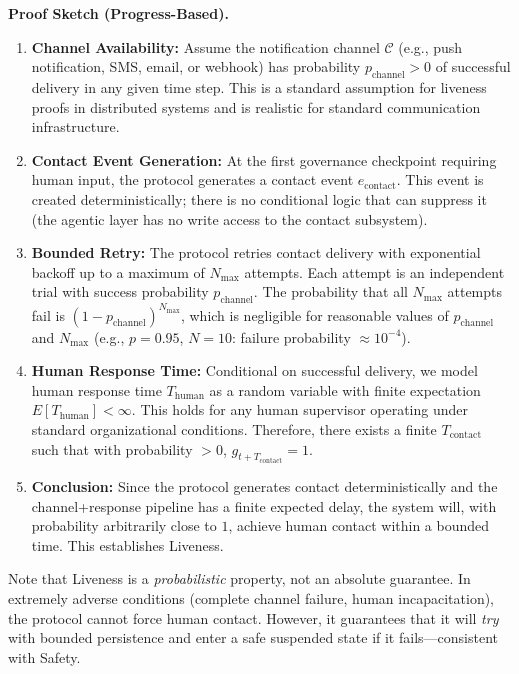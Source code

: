 \bigskip
\noindent\textbf{Proof Sketch (Progress-Based).}
\begin{enumerate}
\item \textbf{Channel Availability:} Assume the notification channel $\mathcal{C}$ (e.g., push notification, SMS, email, or webhook) has probability $p_{\text{channel}} > 0$ of successful delivery in any given time step. This is a standard assumption for liveness proofs in distributed systems and is realistic for standard communication infrastructure.

\item \textbf{Contact Event Generation:} At the first governance checkpoint requiring human input, the protocol generates a contact event $e_{\text{contact}}$. This event is created deterministically; there is no conditional logic that can suppress it (the agentic layer has no write access to the contact subsystem).

\item \textbf{Bounded Retry:} The protocol retries contact delivery with exponential backoff up to a maximum of $N_{\max}$ attempts. Each attempt is an independent trial with success probability $p_{\text{channel}}$. The probability that all $N_{\max}$ attempts fail is $(1 - p_{\text{channel}})^{N_{\max}}$, which is negligible for reasonable values of $p_{\text{channel}}$ and $N_{\max}$ (e.g., $p=0.95$, $N=10$: failure probability $\approx 10^{-4}$).

\item \textbf{Human Response Time:} Conditional on successful delivery, we model human response time $T_{\text{human}}$ as a random variable with finite expectation $E[T_{\text{human}}] < \infty$. This holds for any human supervisor operating under standard organizational conditions. Therefore, there exists a finite $T_{\text{contact}}$ such that with probability $> 0$, $g_{t+T_{\text{contact}}} = 1$.

\item \textbf{Conclusion:} Since the protocol generates contact deterministically and the channel+response pipeline has a finite expected delay, the system will, with probability arbitrarily close to $1$, achieve human contact within a bounded time. This establishes Liveness.
\end{enumerate}

Note that Liveness is a \emph{probabilistic} property, not an absolute guarantee. In extremely adverse conditions (complete channel failure, human incapacitation), the protocol cannot force human contact. However, it guarantees that it will \emph{try} with bounded persistence and enter a safe suspended state if it fails---consistent with Safety.

